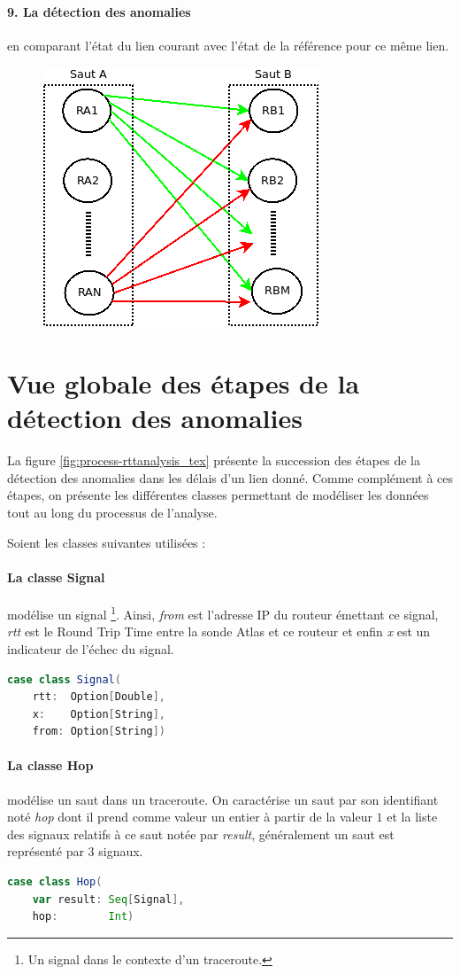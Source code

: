   \paragraph{9. La détection des anomalies } en comparant l'état du lien courant avec l'état de la référence pour ce même lien.

\begin{figure}[H]
	\centering
	\includegraphics[width=0.5\linewidth]{illustrations/link-inference}
	\caption{}
	\label{fig:link-inference}
\end{figure}

\section{Vue globale des étapes de la détection des anomalies}
La figure 	\ref{fig:process-rttanalysis_tex} présente la succession des étapes de la détection des anomalies dans les délais d'un lien donné. Comme complément à ces étapes, on présente les différentes classes permettant de modéliser les données tout au long du processus de l'analyse.

Soient les classes suivantes utilisées : 

\paragraph{La classe Signal} modélise un signal \footnote{Un signal dans le contexte d'un traceroute.}. Ainsi, \textit{from} est l'adresse IP du routeur émettant ce signal, \textit{rtt} est le Round Trip Time entre la sonde Atlas et ce routeur et enfin \textit{x} est un indicateur de l'échec du signal.
\begin{lstlisting}[language=scala]
case class Signal(
	rtt:  Option[Double],
	x:    Option[String],
	from: Option[String])
\end{lstlisting}

\paragraph{La classe Hop} modélise un saut dans un traceroute. On caractérise un saut par son identifiant noté \textit{hop} dont il prend comme valeur un entier à partir de la valeur $1$ et la liste des signaux relatifs à ce saut notée par \textit{result}, généralement un saut est représenté par $3$ signaux.
\begin{lstlisting}[language=scala]
case class Hop(
	var result: Seq[Signal],
	hop:        Int)
\end{lstlisting}
